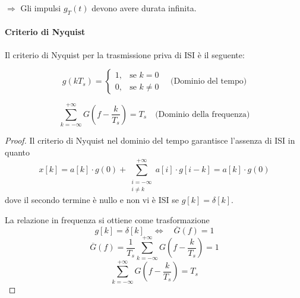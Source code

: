 \(\Rightarrow\) Gli impulsi \( g_T(t) \) devono avere durata infinita.

\paragraph*{Criterio di Nyquist}{Il criterio di Nyquist per la trasmissione priva di ISI è il seguente:}

\[ g(kT_s) =
    \begin{cases}
        1, & \text{se } k=0      \\
        0, & \text{se } k \neq 0
    \end{cases}
    \quad \text{(Dominio del tempo)}
\]

\[ \sum_{k=-\infty}^{+\infty} G\left(f-\frac{k}{T_s}\right) = T_s \quad \text{(Dominio della frequenza)} \]




\begin{proof}
    Il criterio di Nyquist nel dominio del tempo garantisce l'assenza di ISI in quanto
    \[ x[k] = a[k] \cdot g(0) + \sum_{\substack{i=-\infty \\ i \neq k}}^{+\infty} a[i] \cdot g[i-k] = a[k] \cdot g(0) \]
    dove il secondo termine è nullo e non vi è ISI se \( g[k] = \delta[k] \).

    La relazione in frequenza si ottiene come trasformazione
    \[ g[k] = \delta[k] \quad \Longleftrightarrow \quad \overline{G}(f) = 1 \]
    \[ \overline{G}(f) = \frac{1}{T_s} \sum_{k=-\infty}^{+\infty} G\left(f - \frac{k}{T_s}\right) = 1 \]
    \[ \sum_{k=-\infty}^{+\infty} G\left(f - \frac{k}{T_s}\right) = T_s \]
\end{proof}
